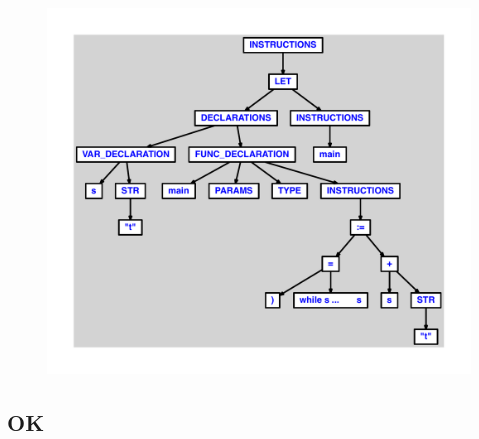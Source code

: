 \documentclass{article}
\begin{document}
\begin{figure}[H]\centering\includegraphics[max width=\textwidth]{ast/ast_331.pdf}\end{figure}\subsection{OK}
\end{document}
